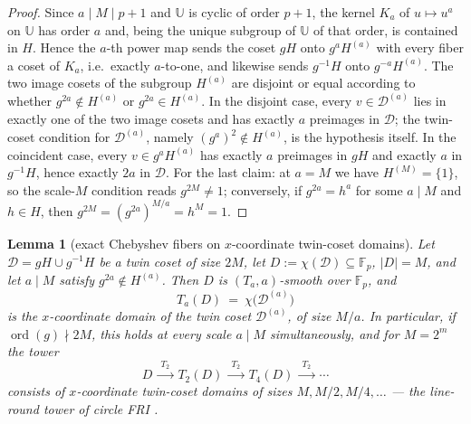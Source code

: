 \documentclass[11pt]{article}
\newtheorem{lemma}[lemma]{Lemma}
\theoremstyle{definition}
\theoremstyle{remark}
\newcommand{\F}{\mathbb{F}}
\newcommand{\UU}{\mathbb{U}}
\begin{document}
\begin{proof}
Since $a\mid M\mid p+1$ and $\UU$ is cyclic of order $p+1$, the kernel $K_a$ of $u\mapsto u^a$ on $\UU$ has order $a$ and, being the unique subgroup of $\UU$ of that order, is contained in $H$. Hence the $a$-th power map sends the coset $gH$ onto $g^aH^{(a)}$ with every fiber a coset of $K_a$, i.e.\ exactly $a$-to-one, and likewise sends $g^{-1}H$ onto $g^{-a}H^{(a)}$. The two image cosets of the subgroup $H^{(a)}$ are disjoint or equal according to whether $g^{2a}\notin H^{(a)}$ or $g^{2a}\in H^{(a)}$. In the disjoint case, every $v\in\mathcal D^{(a)}$ lies in exactly one of the two image cosets and has exactly $a$ preimages in $\mathcal D$; the twin-coset condition for $\mathcal D^{(a)}$, namely $(g^a)^2\notin H^{(a)}$, is the hypothesis itself. In the coincident case, every $v\in g^aH^{(a)}$ has exactly $a$ preimages in $gH$ and exactly $a$ in $g^{-1}H$, hence exactly $2a$ in $\mathcal D$. For the last claim: at $a=M$ we have $H^{(M)}=\{1\}$, so the scale-$M$ condition reads $g^{2M}\ne1$; conversely, if $g^{2a}=h^a$ for some $a\mid M$ and $h\in H$, then $g^{2M}=(g^{2a})^{M/a}=h^{M}=1$.
\end{proof}

\begin{lemma}[exact Chebyshev fibers on $x$-coordinate twin-coset domains]\label{lem:cheb-fibers}
Let $\mathcal D=gH\cup g^{-1}H$ be a twin coset of size $2M$, let $D:=\chi(\mathcal D)\subseteq\F_p$, $|D|=M$, and let $a\mid M$ satisfy $g^{2a}\notin H^{(a)}$. Then $D$ is $(T_a,a)$-smooth over $\F_p$, and
\[
T_a(D)\ =\ \chi\bigl(\mathcal D^{(a)}\bigr)
\]
is the $x$-coordinate domain of the twin coset $\mathcal D^{(a)}$, of size $M/a$. In particular, if $\operatorname{ord}(g)\nmid2M$, this holds at every scale $a\mid M$ simultaneously, and for $M=2^m$ the tower
\[
D\ \xrightarrow{\ T_2\ }\ T_2(D)\ \xrightarrow{\ T_2\ }\ T_4(D)\ \xrightarrow{\ T_2\ }\ \cdots
\]
consists of $x$-coordinate twin-coset domains of sizes $M,M/2,M/4,\dots$ --- the line-round tower of circle FRI \cite{HLP24}.
\end{lemma}
\end{document}
